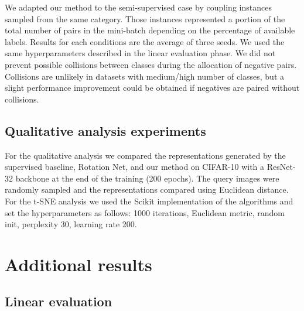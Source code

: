 \documentclass{article}
\begin{document}
We adapted our method to the semi-supervised case by coupling instances sampled from the same category. Those instances represented a portion of the total number of pairs in the mini-batch depending on the percentage of available labels.
Results for each conditions are the average of three seeds. We used the same hyperparameters described in the linear evaluation phase.
We did not prevent possible collisions between classes during the allocation of negative pairs. Collisions are unlikely in datasets with medium/high number of classes, but a slight performance improvement could be obtained if negatives are paired without collisions. 

\subsection{Qualitative analysis experiments}

For the qualitative analysis we compared the representations generated by the supervised baseline, Rotation Net, and our method on CIFAR-10 with a ResNet-32 backbone at the end of the training (200 epochs). The query images were randomly sampled and the representations compared using Euclidean distance.
For the t-SNE analysis we used the Scikit implementation of the algorithms and set the hyperparameters as follows: 1000 iterations, Euclidean metric, random init, perplexity 30, learning rate 200. 


\section{Additional results}\label{appendix:additional_results}
\FloatBarrier

\subsection{Linear evaluation}\label{appendix:additional_linear_evaluation}
\end{document}
